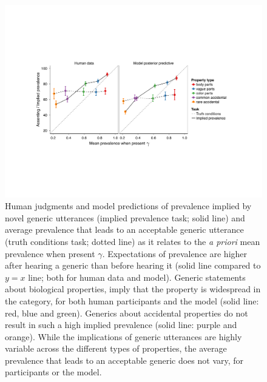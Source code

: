 \documentclass[10pt,letterpaper]{article}
\newcommand{\ndg}[1]{\textcolor{Green}{[ndg: #1]}}
\begin{document}
\begin{figure}
\centering
    \includegraphics[width=\columnwidth]{asym-lines-data-model-2phi-2so-50kx3.pdf}
    \caption{Human judgments and model predictions of prevalence implied by novel generic utterances (implied prevalence task; solid line) and average prevalence that leads to an acceptable generic utterance (truth conditions task; dotted line) as it relates to the \emph{a priori} mean prevalence when present $\gamma$.
    Expectations of prevalence are higher after hearing a generic than before hearing it (solid line compared to $y=x$ line; both for human data and model).
    Generic statements about biological properties, imply that the property is widespread in the category, for both human participants and the model (solid line: red, blue and green). 
    Generics about accidental properties do not result in such a high implied prevalence (solid line: purple and orange).  
	While the implications of generic utterances are highly variable across the different types of properties, the average prevalence that leads to an acceptable generic does not vary, for participants or the model.
}
  \label{fig:exp2b}
\end{figure}
\end{document}
